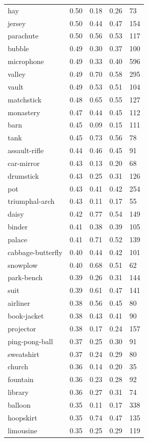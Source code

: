 \begin{center}
\begin{longtable}{lllll}
hay & 0.50 & 0.18 & 0.26 & 73 \\
jersey & 0.50 & 0.44 & 0.47 & 154 \\
parachute & 0.50 & 0.56 & 0.53 & 117 \\
bubble & 0.49 & 0.30 & 0.37 & 100 \\
microphone & 0.49 & 0.33 & 0.40 & 596 \\
valley & 0.49 & 0.70 & 0.58 & 295 \\
vault & 0.49 & 0.53 & 0.51 & 104 \\
matchstick & 0.48 & 0.65 & 0.55 & 127 \\
monastery & 0.47 & 0.44 & 0.45 & 112 \\
barn & 0.45 & 0.09 & 0.15 & 111 \\
tank & 0.45 & 0.73 & 0.56 & 78 \\
assault-rifle & 0.44 & 0.46 & 0.45 & 91 \\
car-mirror & 0.43 & 0.13 & 0.20 & 68 \\
drumstick & 0.43 & 0.25 & 0.31 & 126 \\
pot & 0.43 & 0.41 & 0.42 & 254 \\
triumphal-arch & 0.43 & 0.11 & 0.17 & 55 \\
daisy & 0.42 & 0.77 & 0.54 & 149 \\
binder & 0.41 & 0.38 & 0.39 & 105 \\
palace & 0.41 & 0.71 & 0.52 & 139 \\
cabbage-butterfly & 0.40 & 0.44 & 0.42 & 101 \\
snowplow & 0.40 & 0.68 & 0.51 & 62 \\
park-bench & 0.39 & 0.26 & 0.31 & 144 \\
suit & 0.39 & 0.61 & 0.47 & 141 \\
airliner & 0.38 & 0.56 & 0.45 & 80 \\
book-jacket & 0.38 & 0.43 & 0.41 & 90 \\
projector & 0.38 & 0.17 & 0.24 & 157 \\
ping-pong-ball & 0.37 & 0.25 & 0.30 & 91 \\
sweatshirt & 0.37 & 0.24 & 0.29 & 80 \\
church & 0.36 & 0.14 & 0.20 & 35 \\
fountain & 0.36 & 0.23 & 0.28 & 92 \\
library & 0.36 & 0.27 & 0.31 & 74 \\
balloon & 0.35 & 0.11 & 0.17 & 338 \\
hoopskirt & 0.35 & 0.74 & 0.47 & 135 \\
limousine & 0.35 & 0.25 & 0.29 & 119 \\

\end{longtable}
\end{center}
